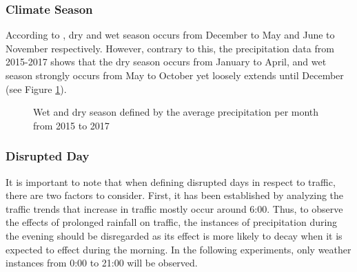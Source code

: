 \subsubsection{Climate Season}

According to , dry and wet season occurs from December to May and June to November respectively. However, contrary to this, the precipitation data from 2015-2017 shows that the dry season occurs from January to April, and wet season strongly occurs from May to October yet loosely extends until December (see Figure \ref{figure_ave_precip}).

\begin{figure}[h]
  \centering
  \captionsetup{justification=centering}
  \caption{Wet and dry season defined by the average precipitation per month from 2015 to 2017}
\label{figure_ave_precip}
\end{figure}



\subsubsection{Disrupted Day}

It is important to note that when defining disrupted days in respect to traffic, there are two factors to consider. First, it has been established by analyzing the traffic trends that increase in traffic mostly occur around 6:00. Thus, to observe the effects of prolonged rainfall on traffic, the instances of precipitation during the evening should be disregarded as its effect is more likely to decay when it is expected to effect during the morning. In the following experiments, only weather instances from 0:00 to 21:00 will be observed.


